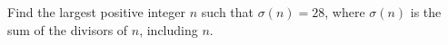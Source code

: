 Find the largest positive integer $n$ such that $\sigma(n) = 28$, where $\sigma(n)$ is the sum of the divisors of $n$, including $n$.
